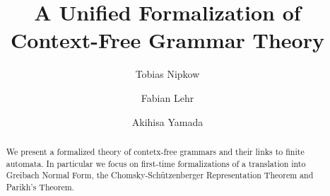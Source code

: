\documentclass[runningheads]{llncs}
\begin{document}
\title{A Unified Formalization of Context-Free Grammar Theory}

\author{Tobias Nipkow \and
Fabian Lehr \and
Akihisa Yamada}
%


\maketitle

\begin{abstract}
We present a formalized theory of contetx-free grammars and
their links to finite automata. In particular we focus on first-time
formalizations of a translation into Greibach Normal Form, the Chomsky-Sch\"utzenberger Representation Theorem and Parikh's Theorem.

\end{abstract}


%







\end{document}
